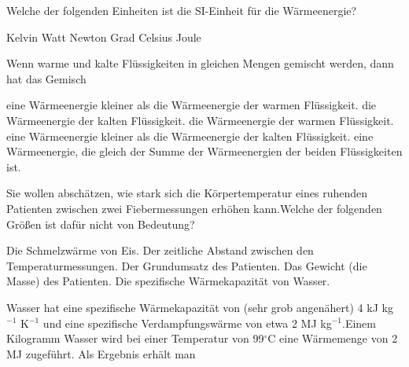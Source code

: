 \documentclass[11pt]{exam}
\begin{document}
\setlength{\voffset}{-0.5in}
\setlength{\headsep}{5pt}

\hspace{2mm}
 \hspace{5mm}
\vspace{4mm}

\begin{questions}

\question Welche der folgenden Einheiten ist die SI-Einheit für die Wärmeenergie?

\begin{choices}
	\choice Kelvin
	\choice Watt
	\choice Newton
	\choice Grad Celsius
	\choice Joule
\end{choices}

\vspace{3mm}\question Wenn warme und kalte Flüssigkeiten in gleichen Mengen gemischt werden, dann hat das Gemisch

\begin{choices}
	\choice eine Wärmeenergie kleiner als die Wärmeenergie der warmen Flüssigkeit.
	\choice die Wärmeenergie der kalten Flüssigkeit.
	\choice die Wärmeenergie der warmen Flüssigkeit.
	\choice eine Wärmeenergie kleiner als die Wärmeenergie der kalten Flüssigkeit.
	\choice eine Wärmeenergie, die gleich der Summe der Wärmeenergien der beiden Flüssigkeiten ist.
\end{choices}

\vspace{3mm}\question Sie wollen abschätzen, wie stark sich die Körpertemperatur eines ruhenden Patienten zwischen zwei Fiebermessungen erhöhen kann.Welche der folgenden Größen ist dafür nicht von Bedeutung?

\begin{choices}
	\choice Die Schmelzwärme von Eis.
	\choice Der zeitliche Abstand zwischen den Temperaturmessungen.
	\choice Der Grundumsatz des Patienten.
	\choice Das Gewicht (die Masse) des Patienten.
	\choice Die spezifische Wärmekapazität von Wasser.
\end{choices}

\vspace{3mm}\question Wasser hat eine spezifische Wärmekapazität von (sehr grob angenähert) 4 kJ kg\(^{-1}\) K\(^{-1}\) und eine spezifische Verdampfungswärme von etwa 2 MJ kg\(^{-1}\).Einem Kilogramm Wasser wird bei einer Temperatur von 99\(^\circ\)C eine Wärmemenge von 2 MJ zugeführt. Als Ergebnis erhält man


\end{questions}
\end{document}
